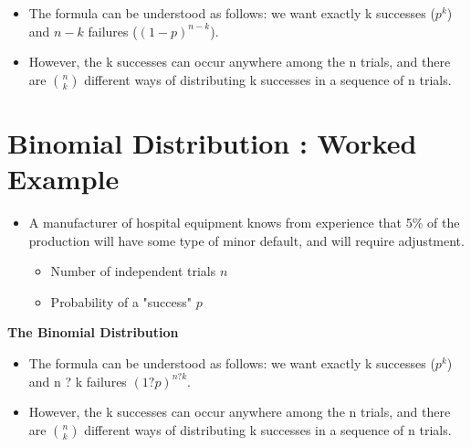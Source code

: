 \documentclass[a4paper,12pt]{article}
\begin{document}




\begin{itemize}
	\item The formula can be understood as follows: we want exactly k successes ($p^k$) and $n - k$ failures ($(1 - p)^{n - k}$).
	\item However, the k successes can occur anywhere among the n trials, and there are ${n \choose k}$ different ways of distributing k successes in a sequence of n trials.
\end{itemize}













\section{Binomial Distribution : Worked Example}
\begin{itemize}
\item A manufacturer of hospital equipment knows from experience that 5\% of the production will have some type of minor default, and will require adjustment.

\begin{itemize}
\item Number of independent trials $n$

\item Probability of a "success" $p$

\end{itemize}
\end{itemize}




\textbf{The Binomial Distribution}


\begin{itemize}
	\item The formula can be understood as follows: we want exactly k successes ($p^k$) and n ? k failures $(1 ? p)^{n ? k}$.
	\item However, the k successes can occur anywhere among the n trials, and there are ${n \choose k}$ different ways of distributing k successes in a sequence of n trials.
\end{itemize}
\end{document}
